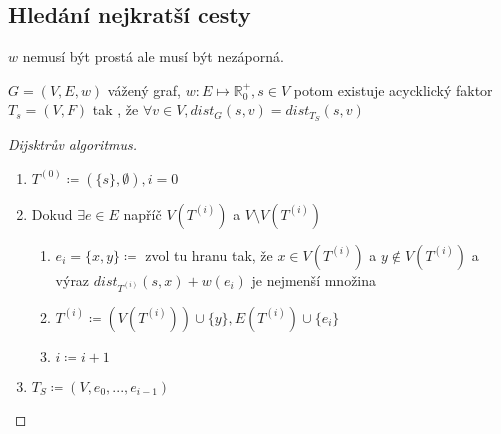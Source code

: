 \documentclass[../main.tex]{subfiles}
\begin{document}
\subsection{Hledání nejkratší cesty}
$w$ nemusí být prostá ale musí být nezáporná. 
\begin{theorem}[Dijkstra]
    $G=(V,E,w)$ vážený graf, $w: E\mapsto \mathbb{R}_0^+, s\in V$
    potom existuje acycklický faktor $T_s=(V,F)$
    tak , že  $\forall v \in V, dist_{G}(s,v) = dist_{T_S}(s,v)$    
\end{theorem}

\begin{proof}[Dijsktrův algoritmus]
    \begin{enumerate}
        \item $T^{(0)} \coloneq (\{ s\}, \emptyset), i=0$
        \item Dokud $\exists e \in E$ napříč $V(T^{(i)})$ a $V \setminus V(T^{(i)})$
        \begin{enumerate}
            \item $e_i  = \{x,y\} \coloneq$ zvol tu hranu tak, že $x\in V(T^{(i)})$ a $y\notin V(T^{(i)})$ a výraz $dist_{T^{(i)}} (s,x) + w(e_i)$ je nejmenší množina
            \item $T^{(i)} \coloneq (V(T^{(i)})) \cup \{ y \}, E(T^{(i)}) \cup \{ e_i \}$
            \item $i\coloneq i + 1$ 
        \end{enumerate}
        \item $T_S \coloneq (V, {e_0,..., e_{i-1}})$
    \end{enumerate}
     
\end{proof}
\end{document}
